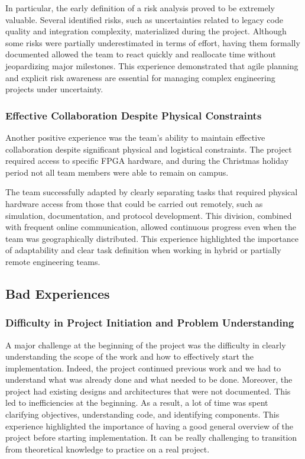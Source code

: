 \documentclass[10pt]{article}
\begin{document}
In particular, the early definition of a risk analysis proved to be extremely valuable. Several identified risks, such as uncertainties related to legacy code quality and integration complexity, materialized during the project. Although some risks were partially underestimated in terms of effort, having them formally documented allowed the team to react quickly and reallocate time without jeopardizing major milestones. This experience demonstrated that agile planning and explicit risk awareness are essential for managing complex engineering projects under uncertainty.

\subsubsection{Effective Collaboration Despite Physical Constraints}
Another positive experience was the team's ability to maintain effective collaboration despite significant physical and logistical constraints. The project required access to specific FPGA hardware, and during the Christmas holiday period not all team members were able to remain on campus. 

The team successfully adapted by clearly separating tasks that required physical hardware access from those that could be carried out remotely, such as simulation, documentation, and protocol development. This division, combined with frequent online communication, allowed continuous progress even when the team was geographically distributed. This experience highlighted the importance of adaptability and clear task definition when working in hybrid or partially remote engineering teams.

\subsection{Bad Experiences}

\subsubsection{Difficulty in Project Initiation and Problem Understanding}
A major challenge at the beginning of the project was the difficulty in clearly understanding the scope of the work and how to effectively start the implementation. Indeed, the project continued previous work and we had to understand what was already done and what needed to be done. Moreover, the project had existing designs and architectures that were not documented. This led to inefficiencies at the beginning. As a result, a lot of time was spent clarifying objectives, understanding code, and identifying components. This experience highlighted the importance of having a good general overview of the project before starting implementation. It can be really challenging to transition from theoretical knowledge to practice on a real project.
\end{document}
